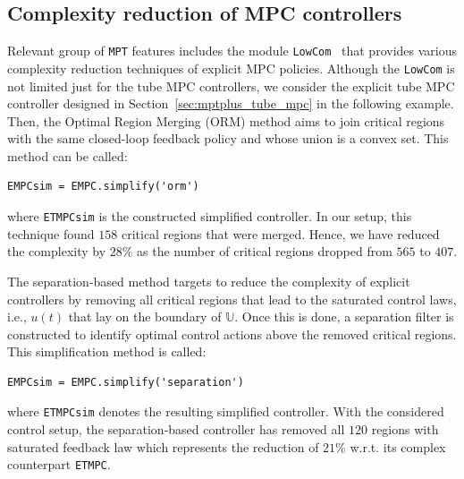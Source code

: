 \documentclass[letterpaper, 10 pt, conference]{ieeeconf}
\begin{document}
\subsection{Complexity reduction of MPC controllers}
\label{sec:code_mpt3lowcom}

Relevant group of \texttt{MPT} features includes the module \texttt{LowCom}~\cite{KH15} that provides various complexity reduction techniques of explicit MPC policies. Although the \texttt{LowCom} is not limited just for the tube MPC controllers, we consider the explicit tube MPC controller designed in Section~\ref{sec:mptplus_tube_mpc} in the following example. Then, the Optimal Region Merging (ORM) method aims to join critical regions with the same closed-loop feedback policy and whose union is a convex set. This method can be called: 
\begin{lstlisting}[style=Matlab-editor]
EMPCsim = EMPC.simplify('orm')
\end{lstlisting}
where \verb|ETMPCsim| is the constructed simplified controller. In our setup, this technique found $158$ critical regions that were merged. Hence, we have reduced the complexity by $28\%$ as the number of critical regions dropped from $565$ to $407$. 

%
%
The separation-based method targets to reduce the complexity of explicit controllers by removing all critical regions that lead to the saturated control laws, i.e., $u(t)$ that lay on the boundary of $\mathbb{U}$. Once this is done, a separation filter is constructed to identify optimal control actions above the removed critical regions. This simplification method is called:
\begin{lstlisting}[style=Matlab-editor]
EMPCsim = EMPC.simplify('separation')
\end{lstlisting}
where \verb|ETMPCsim| denotes the resulting simplified controller. With the considered control setup, the separation-based controller has removed all $120$ regions with saturated feedback law which represents the reduction of $21\%$ w.r.t. its complex counterpart \verb|ETMPC|.
\end{document}
